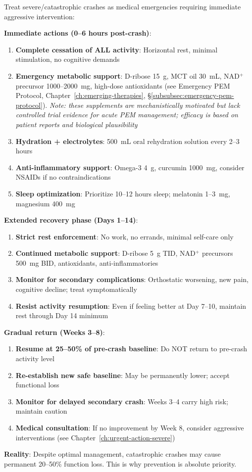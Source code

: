 \begin{warning}[Severe Crash = Medical Emergency]
Treat severe/catastrophic crashes as medical emergencies requiring immediate aggressive intervention:

\textbf{Immediate actions (0--6 hours post-crash)}:
\begin{enumerate}
    \item \textbf{Complete cessation of ALL activity}: Horizontal rest, minimal stimulation, no cognitive demands
    \item \textbf{Emergency metabolic support}: D-ribose 15~g, MCT oil 30~mL, NAD$^+$ precursor 1000--2000~mg, high-dose antioxidants (see Emergency PEM Protocol, Chapter~\ref{ch:emerging-therapies}, \S\ref{subsubsec:emergency-pem-protocol}). \textit{Note: these supplements are mechanistically motivated but lack controlled trial evidence for acute PEM management; efficacy is based on patient reports and biological plausibility}
    \item \textbf{Hydration + electrolytes}: 500~mL oral rehydration solution every 2--3 hours
    \item \textbf{Anti-inflammatory support}: Omega-3 4~g, curcumin 1000~mg, consider NSAIDs if no contraindications
    \item \textbf{Sleep optimization}: Prioritize 10--12 hours sleep; melatonin 1--3~mg, magnesium 400~mg
\end{enumerate}

\textbf{Extended recovery phase (Days 1--14)}:
\begin{enumerate}
    \item \textbf{Strict rest enforcement}: No work, no errands, minimal self-care only
    \item \textbf{Continued metabolic support}: D-ribose 5~g TID, NAD$^+$ precursors 500~mg BID, antioxidants, anti-inflammatories
    \item \textbf{Monitor for secondary complications}: Orthostatic worsening, new pain, cognitive decline; treat symptomatically
    \item \textbf{Resist activity resumption}: Even if feeling better at Day 7--10, maintain rest through Day 14 minimum
\end{enumerate}

\textbf{Gradual return (Weeks 3--8)}:
\begin{enumerate}
    \item \textbf{Resume at 25--50\% of pre-crash baseline}: Do NOT return to pre-crash activity level
    \item \textbf{Re-establish new safe baseline}: May be permanently lower; accept functional loss
    \item \textbf{Monitor for delayed secondary crash}: Weeks 3--4 carry high risk; maintain caution
    \item \textbf{Medical consultation}: If no improvement by Week 8, consider aggressive interventions (see Chapter~\ref{ch:urgent-action-severe})
\end{enumerate}

\textbf{Reality}: Despite optimal management, catastrophic crashes may cause permanent 20--50\% function loss. This is why prevention is absolute priority.
\end{warning}

